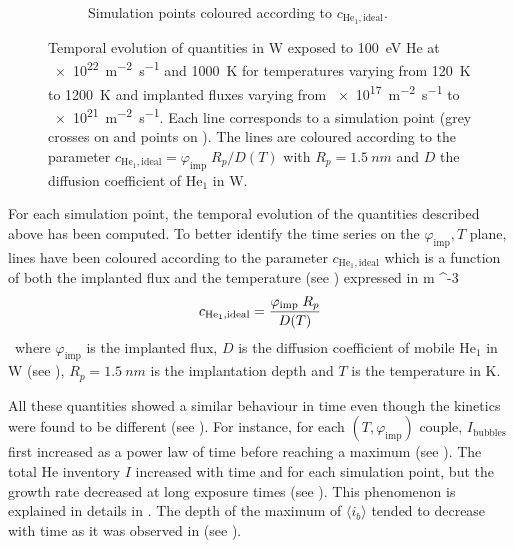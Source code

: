 \begin{figure} [ht!]
\begin{subfigure}{0.5\linewidth}
        \caption{Simulation points coloured according to $c_{\mathrm{He}_1, \mathrm{ideal}}$.}
    \end{subfigure}
    \caption{Temporal evolution of quantities in W exposed to \SI{100}{eV} He at \SI{e22}{m^{-2}.s^{-1}} and \SI{1000}{K} for temperatures varying from \SI{120}{K} to \SI{1200}{K} and implanted fluxes varying from \SI{e17}{m^{-2}s^{-1}} to \SI{e21}{m^{-2}s^{-1}}. Each line corresponds to a simulation point (grey crosses on  and points on ). The lines are coloured according to the parameter $c_{\mathrm{He}_1, \mathrm{ideal}} = \varphi_\mathrm{imp} \; R_p/D(T)$ with $R_p = \SI{1.5}{nm}$ and $D$ the diffusion coefficient of $\mathrm{He}_1$ in W.}
\end{figure}

For each simulation point, the temporal evolution of the quantities described above has been computed.
To better identify the time series on the $\varphi_\mathrm{imp}, T$ plane, lines have been coloured according to the parameter $c_{\mathrm{He}_1, \mathrm{ideal}}$ which is a function of both the implanted flux and the temperature (see ) expressed in \si{m ^{-3}}.

\begin{equation}
    c_{\mathrm{He}_1, \mathrm{ideal}} = \frac{\varphi_\mathrm{imp} \; R_p}{D(T)}
    \labeq{c he1 ideal}
\end{equation}
where $\varphi_\mathrm{imp}$ is the implanted flux, $D$ is the diffusion coefficient of mobile $\mathrm{He}_1$ in W (see ), $R_p = \SI{1.5}{nm}$ is the implantation depth and $T$ is the temperature in \si{K}.

All these quantities showed a similar behaviour in time even though the kinetics were found to be different (see ).
For instance, for each $(T, \varphi_\mathrm{imp})$ couple, $I_\mathrm{bubbles}$ first increased as a power law of time before reaching a maximum (see ).
The total He inventory $I$ increased with time and for each simulation point, but the growth rate decreased at long exposure times (see ).
This phenomenon is explained in details in .
The depth of the maximum of $\langle i_b \rangle$ tended to decrease with time as it was observed in  (see ).


